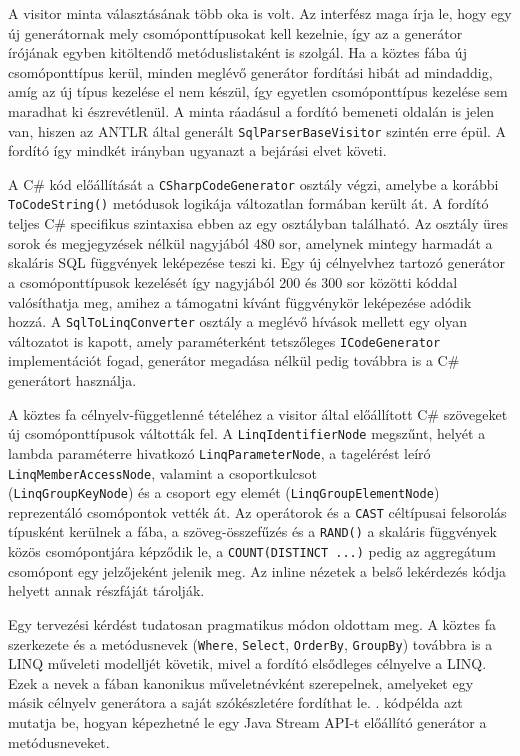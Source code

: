 \documentclass[a4paper,12pt]{article}
\begin{document}
A visitor minta választásának több oka is volt. Az interfész maga írja le, hogy egy új generátornak mely csomóponttípusokat kell kezelnie, így az a generátor írójának egyben kitöltendő metóduslistaként is szolgál. Ha a köztes fába új csomóponttípus kerül, minden meglévő generátor fordítási hibát ad mindaddig, amíg az új típus kezelése el nem készül, így egyetlen csomóponttípus kezelése sem maradhat ki észrevétlenül. A minta ráadásul a fordító bemeneti oldalán is jelen van, hiszen az ANTLR által generált \texttt{SqlParserBaseVisitor} szintén erre épül. A fordító így mindkét irányban ugyanazt a bejárási elvet követi.

A C\# kód előállítását a \texttt{CSharpCodeGenerator} osztály végzi, amelybe a korábbi \texttt{ToCodeString()} metódusok logikája változatlan formában került át. A fordító teljes C\# specifikus szintaxisa ebben az egy osztályban található. Az osztály üres sorok és megjegyzések nélkül nagyjából 480 sor, amelynek mintegy harmadát a skaláris SQL függvények leképezése teszi ki. Egy új célnyelvhez tartozó generátor a csomóponttípusok kezelését így nagyjából 200 és 300 sor közötti kóddal valósíthatja meg, amihez a támogatni kívánt függvénykör leképezése adódik hozzá. A \texttt{SqlToLinqConverter} osztály a meglévő hívások mellett egy olyan változatot is kapott, amely paraméterként tetszőleges \texttt{ICodeGenerator} implementációt fogad, generátor megadása nélkül pedig továbbra is a C\# generátort használja.

A köztes fa célnyelv-függetlenné tételéhez a visitor által előállított C\# szövegeket új csomóponttípusok váltották fel. A \texttt{LinqIdentifierNode} megszűnt, helyét a lambda paraméterre hivatkozó \texttt{LinqParameterNode}, a tagelérést leíró \texttt{LinqMemberAccessNode}, valamint a csoportkulcsot \\(\texttt{LinqGroupKeyNode}) és a csoport egy elemét (\texttt{LinqGroupElementNode}) reprezentáló csomópontok vették át. Az operátorok és a \texttt{CAST} céltípusai felsorolás típusként kerülnek a fába, a szöveg-összefűzés és a \texttt{RAND()} a skaláris függvények közös csomópontjára képződik le, a \texttt{COUNT(DISTINCT ...)} pedig az aggregátum csomópont egy jelzőjeként jelenik meg. Az inline nézetek a belső lekérdezés kódja helyett annak részfáját tárolják.

Egy tervezési kérdést tudatosan pragmatikus módon oldottam meg. A köztes fa szerkezete és a metódusnevek (\texttt{Where}, \texttt{Select}, \texttt{OrderBy}, \texttt{GroupBy}) továbbra is a LINQ műveleti modelljét követik, mivel a fordító elsődleges célnyelve a LINQ. Ezek a nevek a fában kanonikus műveletnévként szerepelnek, amelyeket egy másik célnyelv generátora a saját szókészletére fordíthat le. . kódpélda azt mutatja be, hogyan képezhetné le egy Java Stream API-t előállító generátor a metódusneveket.
\end{document}
